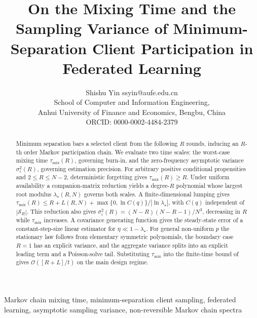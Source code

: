 \documentclass[twoside,11pt]{article}
\begin{document}
\title{On the Mixing Time and the Sampling Variance of Minimum-Separation Client Participation in Federated Learning}

\author{%
\name Shishu Yin \email ssyin@aufe.edu.cn \\
\addr School of Computer and Information Engineering,\\
Anhui University of Finance and Economics, Bengbu, China\\
ORCID: 0000-0002-4484-2379%
}
\maketitle
\begin{abstract}%
Minimum separation bars a selected client from the following $R$ rounds, inducing an $R$-th order Markov participation chain. We evaluate two time scales: the worst-case mixing time $\tau_{\mathrm{mix}}(R)$, governing burn-in, and the zero-frequency asymptotic variance $\sigma_i^2(R)$, governing estimation precision. For arbitrary positive conditional propensities and $2\leq R\leq N-2$, deterministic forgetting gives $\tau_{\mathrm{mix}}(R)\geq R$. Under uniform availability a companion-matrix reduction yields a degree-$R$ polynomial whose largest root modulus $\lambda_\star(R,N)$ governs both scales. A finite-dimensional lumping gives $\tau_{\mathrm{mix}}(R)\leq R+L(R,N)+\max\{0,\ln C(q)\}/|\ln\lambda_\star|$, with $C(q)$ independent of $|\mathcal{S}_R|$. This reduction also gives $\sigma_i^2(R)=(N-R)(N-R-1)/N^3$, decreasing in $R$ while $\tau_{\mathrm{mix}}$ increases. A covariance generating function gives the steady-state error of a constant-step-size linear estimator for $\eta\ll1-\lambda_\star$. For general non-uniform $p$ the stationary law follows from elementary symmetric polynomials, the boundary case $R=1$ has an explicit variance, and the aggregate variance splits into an explicit leading term and a Poisson-solve tail. Substituting $\tau_{\mathrm{mix}}$ into the finite-time bound of \citep{ref1} gives $\mathcal{O}([R+L]/t)$ on the main design regime.
\end{abstract}
\begin{keywords}
Markov chain mixing time, minimum-separation client sampling, federated learning, asymptotic sampling variance, non-reversible Markov chain spectra
\end{keywords}
\end{document}
